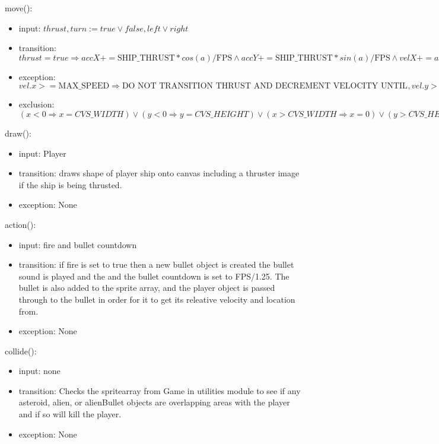 \documentclass[12pt]{article}
\begin{document}
\noindent move():
\begin{itemize}
  \item input: $thrust, turn := true \lor false, left \lor right$
  \item transition: $thrust = true \Rightarrow accX += \mbox{SHIP\_THRUST} * cos(a)/\mbox{FPS} \land accY += \mbox{SHIP\_THRUST} * sin(a)/\mbox{FPS} \land velX += accX \land velY += accY, thrust = false \Rightarrow \mbox{DO NOTHING}, turn = right \Rightarrow rot = -\mbox{TURN\_SPEED}/180*\mbox{PI}/\mbox{FPS}, turn = left \Rightarrow rot =  \mbox{TURN\_SPEED}/180*\mbox{PI}/\mbox{FPS}, turn \lnot (right \lor left) \Rightarrow rot = 0,   space, left, right, down := thrust = true, fire = true, turn = left, turn = right, airbrake = true$
  \item exception: $vel.x >= \mbox{MAX\_SPEED} \Rightarrow \mbox{DO NOT TRANSITION THRUST AND DECREMENT VELOCITY UNTIL IT IS BELOW MAX SPEED}, vel.y >= max \Rightarrow \mbox{DO NOT TRANSITION THRUST AND DECREMENT VELOCITY UNTIL IT IS BELOW MAX SPEED}$
  \item exclusion: $(x < 0 \Rightarrow x = CVS\_WIDTH) \lor (y < 0 \Rightarrow y = CVS\_HEIGHT) \lor (x > CVS\_WIDTH \Rightarrow x = 0) \lor (y > CVS\_HEIGHT \Rightarrow y = 0)$
\end{itemize}

\noindent draw():
\begin{itemize}
  \item input: Player
  \item transition: draws shape of player ship onto canvas including a thruster image if the ship is being thrusted.
  \item exception: None
\end{itemize}

\noindent action():
\begin{itemize}
  \item input: fire and bullet countdown
  \item transition: if fire is set to true then a new bullet object is created the bullet sound is played and the and the bullet countdown is set to FPS/1.25. The bullet is also added to the sprite array, and the player object is passed through to the bullet in order for it to get its releative velocity and location from.
  \item exception: None
\end{itemize}

\noindent collide():
\begin{itemize}
  \item input: none
  \item transition: Checks the spritearray from Game in utilities module to see if any asteroid, alien, or alienBullet objects are overlapping areas with the player and if so will kill the player.
  \item exception: None
\end{itemize}
\end{document}
